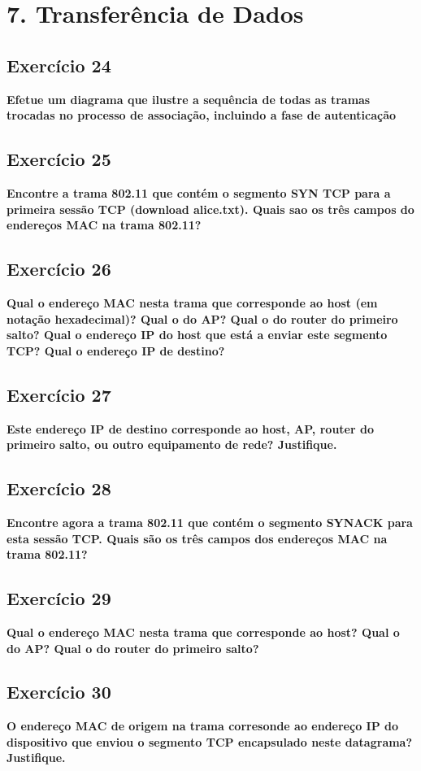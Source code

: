 \documentclass[a4paper]{report}
\begin{document}
\chapter{7. Transferência de Dados}
\section{Exercício 24}
\textbf{Efetue um diagrama que ilustre a sequência de todas as tramas trocadas
    no processo de associação, incluindo a fase de autenticação}

\section{Exercício 25}
\textbf{Encontre a trama 802.11 que contém o segmento SYN TCP para a primeira
    sessão TCP (download alice.txt). Quais sao os três campos do endereços MAC
    na trama 802.11?}

\section{Exercício 26}
\textbf{Qual o endereço MAC nesta trama que corresponde ao host (em notação
    hexadecimal)? Qual o do AP? Qual o do router do primeiro salto? Qual o
    endereço IP do host que está a enviar este segmento TCP? Qual o endereço IP
    de destino?}

\section{Exercício 27}
\textbf{Este endereço IP de destino corresponde ao host, AP, router do primeiro
    salto, ou outro equipamento de rede? Justifique.}

\section{Exercício 28}
\textbf{Encontre agora a trama 802.11 que contém o segmento SYNACK para esta
    sessão TCP. Quais são os três campos dos endereços MAC na trama 802.11?}

\section{Exercício 29}
\textbf{Qual o endereço MAC nesta trama que corresponde ao host? Qual o do AP?
    Qual o do router do primeiro salto?}

\section{Exercício 30}
\textbf{O endereço MAC de origem na trama corresonde ao endereço IP do
    dispositivo que enviou o segmento TCP encapsulado neste datagrama?
    Justifique.}
\end{document}
